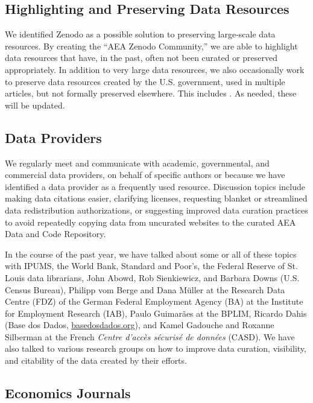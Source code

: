 \documentclass[PP]{AEA}
\newcommand{\aeadcr}{AEA Data and Code Repository}
\begin{document}
\subsection{Highlighting and Preserving Data Resources}

We identified Zenodo as a possible solution to preserving large-scale data resources. By creating the ``AEA Zenodo Community,'' we are able to highlight data resources that have, in the past, often not been curated or preserved appropriately. In addition to very large data resources, we also occasionally work to preserve data resources created by the U.S. government, used in multiple articles, but not formally preserved elsewhere. This includes \citet{SEER2021,BRFSS2021a,BRFSS2021b,SMARTBRFSS2021}. As needed, these will be updated. 


\subsection{Data Providers}
\label{sec:producers}

We regularly meet and communicate with academic, governmental, and commercial data providers, on behalf of specific authors or because we have identified a data provider as a frequently used resource. Discussion topics include making data citations easier, clarifying licenses, requesting blanket or streamlined data redistribution authorizations, or suggesting improved data curation practices to avoid repeatedly copying data from uncurated websites to the curated \aeadcr{}. 

In the course of the past year, we have talked about some or all of these topics with IPUMS, the World Bank, Standard and Poor's, the Federal Reserve of St. Louis data librarians, John Abowd, Rob Sienkiewicz, and Barbara Downs (U.S. Census Bureau), Philipp vom Berge and Dana Müller at the Research Data Centre (FDZ) of the German Federal Employment Agency (BA) at the Institute for Employment Research (IAB), Paulo Guimarães at the \ac{BPLIM}, Ricardo Dahis (Base dos Dados, \href{https://basedosdados.org/}{basedosdados.org}), and Kamel Gadouche and Roxanne Silberman at the French \textit{Centre d'accès sécurisé de données} (CASD). We have also talked to various research groups on how to improve data curation, visibility, and citability of the data created by their efforts.

\subsection{Economics Journals}
\end{document}
